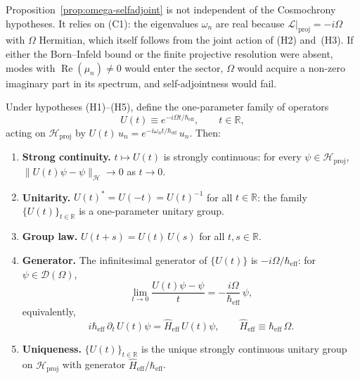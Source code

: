     \begin{remark}
      Proposition~\ref{prop:omega-selfadjoint} is not independent of the Cosmochrony hypotheses.
      It relies on (C1): the eigenvalues $\omega_n$ are real because $\mathcal{L}|_{\mathrm{proj}}
      = -i\Omega$ with $\Omega$ Hermitian, which itself follows from the joint action of
      (H2) and~(H3).
      If either the Born--Infeld bound or the finite projective resolution were absent, modes
      with $\operatorname{Re}(\mu_n) \neq 0$ would enter the sector, $\Omega$ would acquire
      a non-zero imaginary part in its spectrum, and self-adjointness would fail.
    \end{remark}

    \begin{theorem}
      \label{thm:unitary-group}
      Under hypotheses \textup{(H1)--(H5)}, define the one-parameter family of operators
      \[
        U(t) \equiv e^{-i\Omega t/\hbar_{\mathrm{eff}}},
        \qquad t \in \mathbb{R},
      \]
      acting on $\mathcal{H}_{\mathrm{proj}}$ by
      $U(t)\,u_n = e^{-i\omega_n t/\hbar_{\mathrm{eff}}}\,u_n$.
      Then:
      \begin{enumerate}
        \item[(U1)] \textbf{Strong continuity.}
        $t \mapsto U(t)$ is strongly continuous: for every
        $\psi \in \mathcal{H}_{\mathrm{proj}}$,
        $\|U(t)\psi - \psi\|_{\mathcal{H}} \to 0$ as $t \to 0$.

        \item[(U2)] \textbf{Unitarity.}
        $U(t)^* = U(-t) = U(t)^{-1}$ for all $t \in \mathbb{R}$:
        the family $\{U(t)\}_{t \in \mathbb{R}}$ is a one-parameter unitary group.

        \item[(U3)] \textbf{Group law.}
        $U(t+s) = U(t)\,U(s)$ for all $t, s \in \mathbb{R}$.

        \item[(U4)] \textbf{Generator.}
        The infinitesimal generator of $\{U(t)\}$ is $-i\Omega/\hbar_{\mathrm{eff}}$:
        for $\psi \in \mathcal{D}(\Omega)$,
        \[
          \lim_{t \to 0} \frac{U(t)\psi - \psi}{t}
          = -\frac{i\Omega}{\hbar_{\mathrm{eff}}}\,\psi,
        \]
        equivalently,
        \[
          i\hbar_{\mathrm{eff}}\,\partial_t\,U(t)\psi = \hat{H}_{\mathrm{eff}}\,U(t)\psi,
          \qquad \hat{H}_{\mathrm{eff}} \equiv \hbar_{\mathrm{eff}}\,\Omega.
        \]

        \item[(U5)] \textbf{Uniqueness.}
        $\{U(t)\}_{t \in \mathbb{R}}$ is the unique strongly continuous unitary group on
        $\mathcal{H}_{\mathrm{proj}}$ with generator $\hat{H}_{\mathrm{eff}}/\hbar_{\mathrm{eff}}$.
      \end{enumerate}
    \end{theorem}

